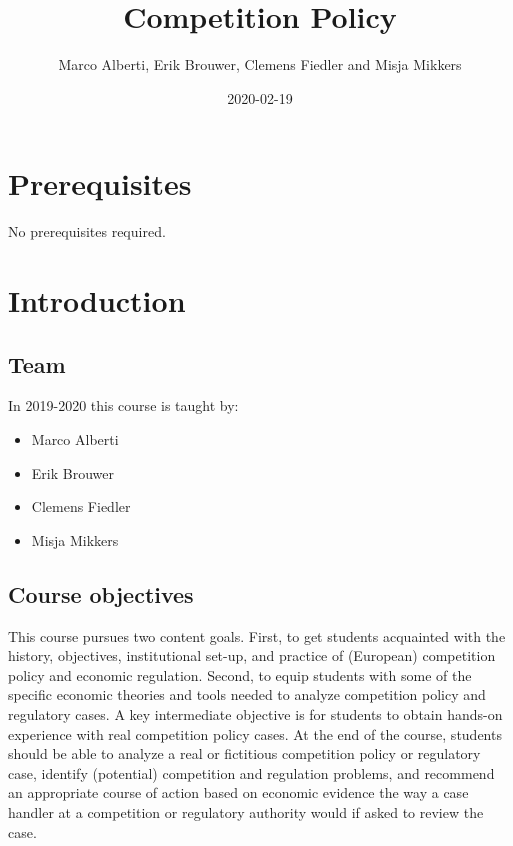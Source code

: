 \documentclass[]{book}
\title{Competition Policy}
\author{Marco Alberti, Erik Brouwer, Clemens Fiedler and Misja Mikkers}
\date{2020-02-19}
\providecommand{\tightlist}{%
  \setlength{\itemsep}{0pt}\setlength{\parskip}{0pt}}
\begin{document}
\maketitle

{
\setcounter{tocdepth}{1}
\tableofcontents
}
\chapter{Prerequisites}\label{prerequisites}

No prerequisites required.

\chapter{Introduction}\label{intro}

\section{Team}\label{team}

In 2019-2020 this course is taught by:

\begin{itemize}
\tightlist
\item
  Marco Alberti
\item
  Erik Brouwer
\item
  Clemens Fiedler
\item
  Misja Mikkers
\end{itemize}

\section{Course objectives}\label{course-objectives}

This course pursues two content goals. First, to get students acquainted
with the history, objectives, institutional set-up, and practice of
(European) competition policy and economic regulation. Second, to equip
students with some of the specific economic theories and tools needed to
analyze competition policy and regulatory cases. A key intermediate
objective is for students to obtain hands-on experience with real
competition policy cases. At the end of the course, students should be
able to analyze a real or fictitious competition policy or regulatory
case, identify (potential) competition and regulation problems, and
recommend an appropriate course of action based on economic evidence the
way a case handler at a competition or regulatory authority would if
asked to review the case.
\end{document}
